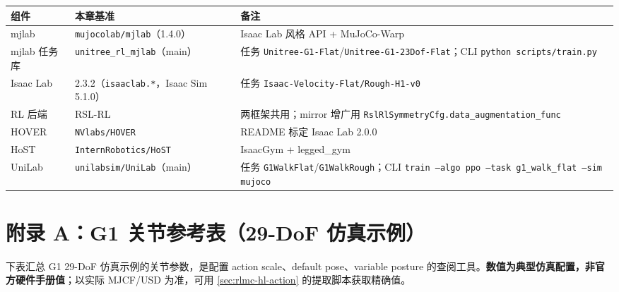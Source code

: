 \begin{center}
\small
\begin{tabular}{p{3.4cm}p{4.0cm}p{5.2cm}}
\hline
组件 & 本章基准 & 备注 \\
\hline
mjlab & \texttt{mujocolab/mjlab}（1.4.0） & Isaac Lab 风格 API + MuJoCo-Warp\cite{mjlab2026} \\
mjlab 任务库 & \texttt{unitree\_rl\_mjlab}（main） & 任务 \texttt{Unitree-G1-Flat}/\texttt{Unitree-G1-23Dof-Flat}；CLI \texttt{python scripts/train.py} \\
Isaac Lab & 2.3.2（\texttt{isaaclab.*}，Isaac Sim 5.1.0） & 任务 \texttt{Isaac-Velocity-Flat/Rough-H1-v0} \\
RL 后端 & RSL-RL & 两框架共用；mirror 增广用 \texttt{RslRlSymmetryCfg.data\_augmentation\_func} \\
HOVER & \texttt{NVlabs/HOVER} & README 标定 Isaac Lab 2.0.0 \\
HoST & \texttt{InternRobotics/HoST} & IsaacGym + legged\_gym \\
UniLab & \texttt{unilabsim/UniLab}（main） & 任务 \texttt{G1WalkFlat}/\texttt{G1WalkRough}；CLI \texttt{train --algo ppo --task g1\_walk\_flat --sim mujoco}\cite{unilab2026} \\
\hline
\end{tabular}
\end{center}

\section*{附录 A：G1 关节参考表（29-DoF 仿真示例）}

下表汇总 G1 29-DoF 仿真示例的关节参数，是配置 action scale、default pose、variable posture 的查阅工具。\textbf{数值为典型仿真配置，非官方硬件手册值}；以实际 MJCF/USD 为准，可用 \cref{sec:rlmc-hl-action} 的提取脚本获取精确值。

